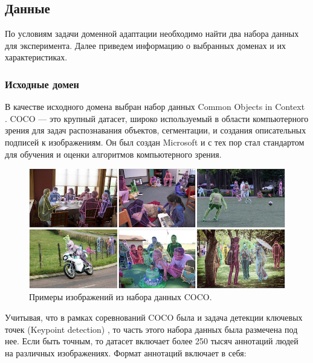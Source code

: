\subsection{Данные}

По условиям задачи доменной адаптации необходимо найти два набора данных для эксперимента. Далее приведем информацию о выбранных доменах и их характеристиках.

\subsubsection*{Исходные домен}

В качестве исходного домена выбран набор данных Common Objects in Context \cite{COCO_dataset}. COCO — это крупный датасет, широко используемый в области компьютерного зрения для задач распознавания объектов, сегментации, и создания описательных подписей к изображениям. Он был создан Microsoft и с тех пор стал стандартом для обучения и оценки алгоритмов компьютерного зрения.

\begin{figure}[h]
	\centering
	\includegraphics[width=\textwidth]{./images/data_info/coco_dataset}
	\caption{Примеры изображений из набора данных COCO. \cite{COCO_topology}}
	\label{fig:coco_dataset}
\end{figure}

Учитывая, что в рамках соревнований COCO была и задача детекции ключевых точек (Keypoint detection) \cite{COCO_topology}, то часть этого набора данных была размечена под нее. Если быть точным, то датасет включает более 250 тысяч аннотаций людей на различных изображениях. Формат аннотаций включает в себя:

